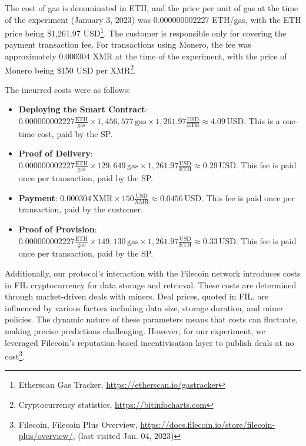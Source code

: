 \documentclass[pdftex,twocolumn,epjc3]{svjour3}
\begin{document}
The cost of gas is denominated in ETH, and the price per unit of gas at the time of the experiment (January 3, 2023) was 0.000000002227 ETH/gas, with the ETH price being \$1,261.97 USD\footnote{Etherscan Gas Tracker, \url{https://etherscan.io/gastracker}}.
The customer is responsible only for covering the payment transaction fee. For transactions using Monero, the fee was approximately 0.000304 XMR at the time of the experiment, with the price of Monero being \$150 USD per XMR\footnote{Cryptocurrency statistics, \url{https://bitinfocharts.com}}.

The incurred costs were as follows:
\begin{sloppypar}
\begin{itemize}
    \item \textbf{Deploying the Smart Contract}: \( 0.000000002227 \frac{\text{ETH}}{\text{gas}} \times 1,456,577 \, \text{gas} \times 1,261.97 \frac{\text{USD}}{\text{ETH}} \approx 4.09 \, \text{USD} \). This is a one-time cost, paid by the SP.

    \item \textbf{Proof of Delivery}: \( 0.000000002227 \frac{\text{ETH}}{\text{gas}} \times 129,649 \, \text{gas} \times 1,261.97 \frac{\text{USD}}{\text{ETH}} \approx 0.29 \, \text{USD} \). This fee is paid once per transaction, paid by the SP.

    \item \textbf{Payment}: \( 0.000304 \, \text{XMR} \times 150 \frac{\text{USD}}{\text{XMR}} \approx 0.0456 \, \text{USD} \).  This fee is paid once per transaction, paid by the customer.
        
    \item \textbf{Proof of Provision}: \( 0.000000002227 \frac{\text{ETH}}{\text{gas}} \times 149,130 \, \text{gas} \times 1,261.97 \frac{\text{USD}}{\text{ETH}} \approx 0.33 \, \text{USD} \). This fee is paid once per transaction, paid by the SP.
\end{itemize}
\end{sloppypar}

Additionally, our protocol's interaction with the Filecoin network introduces costs in FIL cryptocurrency for data storage and retrieval. These costs are determined through market-driven deals with miners. Deal prices, quoted in FIL, are influenced by various factors including data size, storage duration, and miner policies. The dynamic nature of these parameters means that costs can fluctuate, making precise predictions challenging. However, for our experiment, we leveraged Filecoin's reputation-based incentivisation layer to publish deals at no cost\footnote{Filecoin, Filecoin Plus Overview, \url{https://docs.filecoin.io/store/filecoin-plus/overview/}, (last visited Jan. 04, 2023)}.
\end{document}
